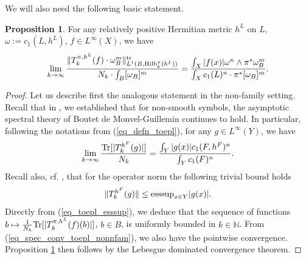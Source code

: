 \documentclass[12pt]{article}
\numberwithin{equation}{section}
\theoremstyle{theorem}
\theoremstyle{definition}
\newtheorem{prop}[thm]{Proposition}
\theoremstyle{remark}
\newcommand{\nat}{\mathbb{N}}
\begin{document}
	We will also need the following basic statement.
	\begin{prop}\label{prop_l1_toepl_conv}
		For any relatively positive Hermitian metric $h^L$ on $L$, $\omega := c_1(L, h^L)$, $f \in L^{\infty}(X)$, we have 
		\begin{equation}
			\lim_{k \to \infty}
			\frac{\| 
				T^{\pi, h^L}_{k}(f)  \cdot \omega_B^m
			\|_{L^1(B, {\textrm{Hilb}}^{\pi}_k(h^L))}^{{\rm{tr}}}}{N_k \cdot \int_B [\omega_B]^m}
			=
			\frac{\int_X |f(x)| \omega^n \wedge \pi^* \omega_B^m}{\int_X c_1(L)^n \cdot \pi^* [\omega_B]^m}.
		\end{equation}
	\end{prop}
	\begin{proof}
		Let us describe first the analogous statement in the non-family setting.
		Recall that in \cite[Theorem 5.4]{FinSubmToepl}, we established that for non-smooth symbols, the asymptotic spectral theory of Boutet de Monvel-Guillemin \cite[Theorem 13.13]{BoutGuillSpecToepl} continues to hold.
		In particular, following the notations from (\ref{eq_defn_toepl}), for any $g \in L^{\infty}(Y)$, we have
		\begin{equation}\label{eq_spec_conv_toepl_nonnfam}
			\lim_{k \to \infty}
			\frac{ {\rm{Tr}}[| T^{h^F}_{k}(g)|]}{N_k}
			=
			\frac{\int_Y |g(x)| c_1(F, h^F)^n}{\int_Y c_1(F)^n}.
		\end{equation}
		Recall also, cf. \cite[Lemma 5.7]{FinSubmToepl}, that for the operator norm the following trivial bound holds
		\begin{equation}\label{eq_toepl_esssup}
			\| T^{h^F}_{k}(g) \| \leq {\rm{esssup}}_{x \in Y} |g(x)|.
		\end{equation}
		Directly from (\ref{eq_toepl_esssup}), we deduce that the sequence of functions $b \mapsto \frac{1}{N_k}  {\rm{Tr}}[| T^{\pi, h^L}_{k}(f)(b)|]$, $b \in B$, is uniformly bounded in $k \in \nat$.
		From (\ref{eq_spec_conv_toepl_nonnfam}), we also have the pointwise convergence. 
		Proposition \ref{prop_l1_toepl_conv} then follows by the Lebesgue dominated convergence theorem.
	\end{proof}
	
\end{document}
